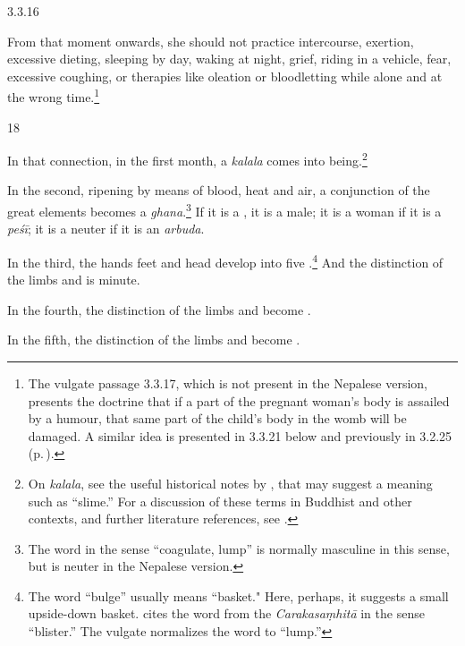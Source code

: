 \begin{translation}
\item[3.3.16]

From that moment onwards, she should not practice intercourse,
exertion, excessive dieting, sleeping by day, waking at night, grief,
riding in a vehicle, fear, excessive coughing, or therapies like
oleation or bloodletting while alone and at the wrong
time.\footnote{The vulgate passage 3.3.17, which is not present in the
    Nepalese version, presents the doctrine that if a part of the pregnant
    woman's body is assailed by a humour, that same part of the child's
    body in the womb will be damaged.  A similar idea is presented in 
    3.3.21 below and previously in 3.2.25 (p.\,\pageref{3.2.25}).}


\item [18]

In that connection, in the first month, a \emph{kalala} comes into
being.\footnote{On \emph{kalala}, see the useful historical notes by
    \citet[535--536]{das-2003}, that may suggest a meaning such as
    “slime.”  For a discussion of these terms in Buddhist and other
    contexts, and further literature references, see
    \cite{agos-2004,krit-2013,krit-2009,sune-1991}. }
    
In the second, ripening by means of blood, heat and air, a conjunction
of the great elements becomes a \emph{ghana}.\footnote{The word
     in the sense “coagulate, lump” is normally masculine in
    this sense, but is neuter in the Nepalese version.}  If it is a
    , it is a male; it is a woman if it is a
    \emph{peśī}; it is a neuter if it is an \emph{arbuda}.
        
In the third, the hands feet and head develop into five
.\footnote{The word  “bulge” usually
    means “basket."  Here, perhaps, it suggests a small upside-down
    basket. \cite[652]{moni-sans} cites the word from the
    \emph{Carakasaṃhitā} in the sense “blister.”  The vulgate normalizes
    the word to  “lump.”}  And the distinction of the limbs
    and  is minute.
        
In the fourth, the distinction of the limbs and  become .  
    
In the fifth, the distinction of the limbs and  become .
    

\end{translation}
